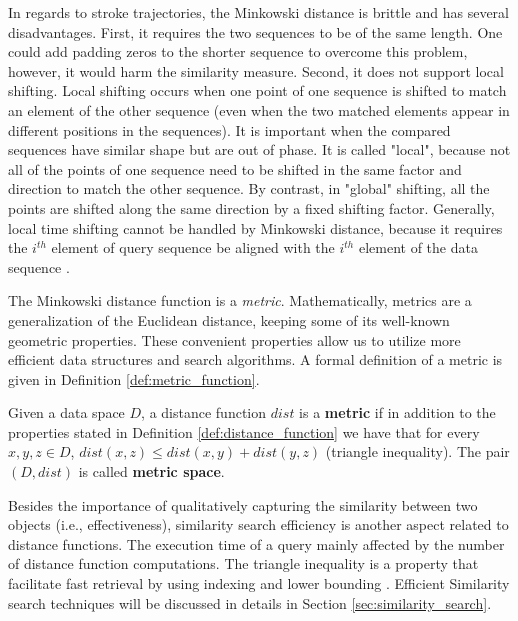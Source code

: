 \iftoggle{edit-mode}{\hspace{0pt}\marginpar{Drawbacks of the Minkowski distance}}{}
In regards to stroke trajectories, the Minkowski distance is  brittle and has several disadvantages.
First, it requires the two sequences to be of the same length. One could add padding zeros to the shorter sequence to overcome this problem, however, it would harm the similarity measure. Second, it does not support local shifting. Local shifting occurs when one point of one sequence is shifted to match an element of the other sequence (even when the two matched elements appear in different positions in the sequences). It is important when the compared sequences have similar shape but are out of phase. It is called "local", because not all of the points of one sequence need to be shifted in the same factor and direction to match the other sequence. By contrast, in "global" shifting, all the points are shifted along the same direction by a fixed shifting factor. Generally, local time shifting cannot be handled by Minkowski distance, because it requires the $i^{th}$ element of query sequence be aligned with the $i^{th}$ element of the data sequence \cite{chen2005similarity}.

\iftoggle{edit-mode}{\hspace{0pt}\marginpar{Metric Definition}}{}
The Minkowski distance function is a \emph{metric}. Mathematically, metrics are a generalization of the Euclidean distance, keeping some of its well-known geometric properties. These convenient properties allow us to utilize more efficient data structures and search algorithms. A formal definition of a metric is given in Definition \ref{def:metric_function}.

\begin{definition}
Given a data space $D$, a distance function $dist$ is a \textbf{metric} if in addition to the properties stated in Definition \ref{def:distance_function} we have that for every $x,y,z \in D$, $dist(x,z) \leq dist(x,y) + dist(y,z)$ (triangle inequality). The pair $(D,dist)$ is called \textbf{metric space}.
\label{def:metric_function}
\end{definition}

\iftoggle{edit-mode}{\hspace{0pt}\marginpar{Efficiency and Triangularity}}{}
Besides the importance of qualitatively capturing the similarity between two objects (i.e., effectiveness), similarity search efficiency is another aspect related to distance functions. The execution time of a query mainly affected by the number of distance function computations. 
The triangle inequality is a property that facilitate fast retrieval by using indexing and lower bounding \cite{chen2005similarity}. 
Efficient Similarity search techniques will be discussed in details in Section \ref{sec:similarity_search}.

